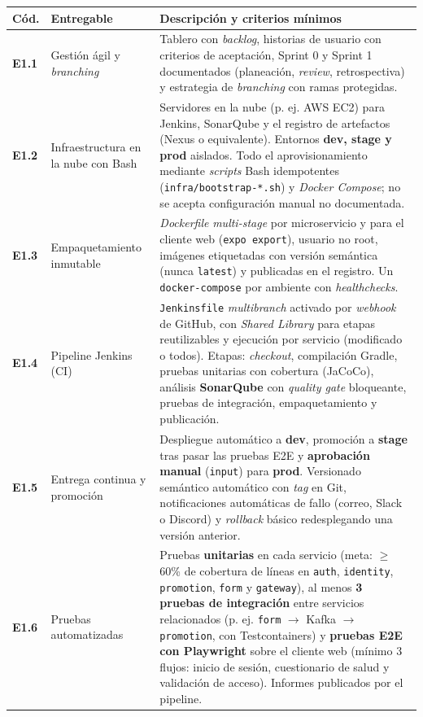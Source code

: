 \documentclass[10pt,letterpaper]{article}
\begin{document}
\begin{tabularx}{\textwidth}{|L{1.0cm}|L{3.3cm}|X|}
\hline
{}
\textbf{Cód.} & \textbf{Entregable} & \textbf{Descripción y criterios mínimos} \\ \hline
\textbf{E1.1} & Gestión ágil y \textit{branching} & Tablero con \textit{backlog}, historias de usuario con criterios de aceptación, Sprint 0 y Sprint 1 documentados (planeación, \textit{review}, retrospectiva) y estrategia de \textit{branching} con ramas protegidas. \\ \hline
\textbf{E1.2} & Infraestructura en la nube con Bash & Servidores en la nube (p. ej. AWS EC2) para Jenkins, SonarQube y el registro de artefactos (Nexus o equivalente). Entornos \textbf{dev, stage y prod} aislados. Todo el aprovisionamiento mediante \textit{scripts} Bash idempotentes (\texttt{infra/bootstrap-*.sh}) y \textit{Docker Compose}; no se acepta configuración manual no documentada. \\ \hline
\textbf{E1.3} & Empaquetamiento inmutable & \textit{Dockerfile} \textit{multi-stage} por microservicio y para el cliente web (\texttt{expo export}), usuario no root, imágenes etiquetadas con versión semántica (nunca \texttt{latest}) y publicadas en el registro. Un \texttt{docker-compose} por ambiente con \textit{healthchecks}. \\ \hline
\textbf{E1.4} & Pipeline Jenkins (CI) & \texttt{Jenkinsfile} \textit{multibranch} activado por \textit{webhook} de GitHub, con \textit{Shared Library} para etapas reutilizables y ejecución por servicio (modificado o todos). Etapas: \textit{checkout}, compilación Gradle, pruebas unitarias con cobertura (JaCoCo), análisis \textbf{SonarQube} con \textit{quality gate} bloqueante, pruebas de integración, empaquetamiento y publicación. \\ \hline
\textbf{E1.5} & Entrega continua y promoción & Despliegue automático a \textbf{dev}, promoción a \textbf{stage} tras pasar las pruebas E2E y \textbf{aprobación manual} (\texttt{input}) para \textbf{prod}. Versionado semántico automático con \textit{tag} en Git, notificaciones automáticas de fallo (correo, Slack o Discord) y \textit{rollback} básico redesplegando una versión anterior. \\ \hline
\textbf{E1.6} & Pruebas automatizadas & Pruebas \textbf{unitarias} en cada servicio (meta: $\geq$ 60\% de cobertura de líneas en \texttt{auth}, \texttt{identity}, \texttt{promotion}, \texttt{form} y \texttt{gateway}), al menos \textbf{3 pruebas de integración} entre servicios relacionados (p. ej. \texttt{form} $\rightarrow$ Kafka $\rightarrow$ \texttt{promotion}, con Testcontainers) y \textbf{pruebas E2E con Playwright} sobre el cliente web (mínimo 3 flujos: inicio de sesión, cuestionario de salud y validación de acceso). Informes publicados por el pipeline. \\ \hline

\end{tabularx}
\end{document}
